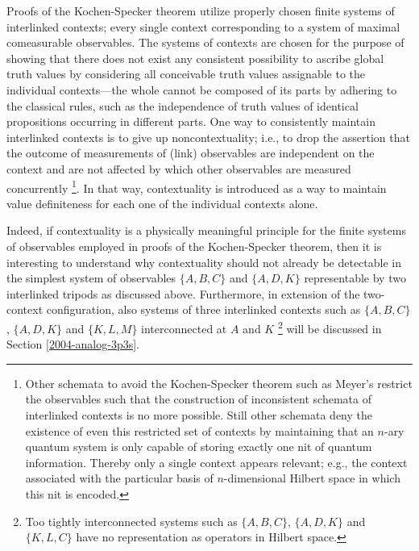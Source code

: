 \documentclass[12pt]{iopart}
\begin{document}
Proofs of the Kochen-Specker theorem
\cite{specker-60,kamber64,kamber65,ZirlSchl-65,bell-66,kochen1,Alda,Alda2,peres,mermin-93,svozil-tkadlec,tkadlec-00,svozil-ql}
utilize properly chosen finite systems of interlinked contexts;
every single context corresponding to a system
of maximal comeasurable observables.
The systems of contexts are chosen for the purpose of showing that there does not exist
any consistent possibility to ascribe global truth values by considering all conceivable
truth values assignable to the individual contexts---the whole cannot be composed of
its parts by adhering to the classical rules, such as
the independence of truth values of identical propositions occurring in different parts.
One way to consistently maintain interlinked contexts
is to give up noncontextuality; i.e., to drop
the assertion that the outcome of measurements of (link) observables are
independent on the context and are not affected by which other observables are measured concurrently
\footnote{
Other schemata to avoid the Kochen-Specker theorem such as Meyer's \cite{meyer:99}
restrict the observables such that the construction of inconsistent schemata of interlinked contexts
is no more possible.
Still other schemata \cite{svozil-2003-garda} deny the existence of even this restricted set of contexts
by maintaining that an $n$-ary quantum system is only capable of storing
exactly one nit of quantum information. Thereby only a single context appears relevant;
e.g., the context associated with the particular basis of $n$-dimensional Hilbert space
in which this nit is encoded.}.
In that way, contextuality is introduced as a way to maintain value definiteness
for each one of the individual contexts alone.

Indeed, if contextuality is a physically meaningful principle
for the finite systems of observables employed in proofs of the Kochen-Specker theorem,
then it is interesting to understand why contextuality should not already be
detectable in the simplest system of observables
$\{A,B,C\}$
and
$\{A,D,K\}$
representable by two interlinked tripods as discussed above.
Furthermore, in extension of the two-context configuration,
also systems of three interlinked contexts such as
$\{A,B,C\}$,
$\{A,D,K\}$
and
$\{K,L,M\}$ interconnected at $A$ and $K$
\footnote{
Too tightly interconnected systems such as
$\{A,B,C\}$,
$\{A,D,K\}$
and
$\{K,L,C\}$
have no representation as operators in Hilbert space.
}  will be discussed in Section  \ref{2004-analog-3p3s}.
\end{document}
